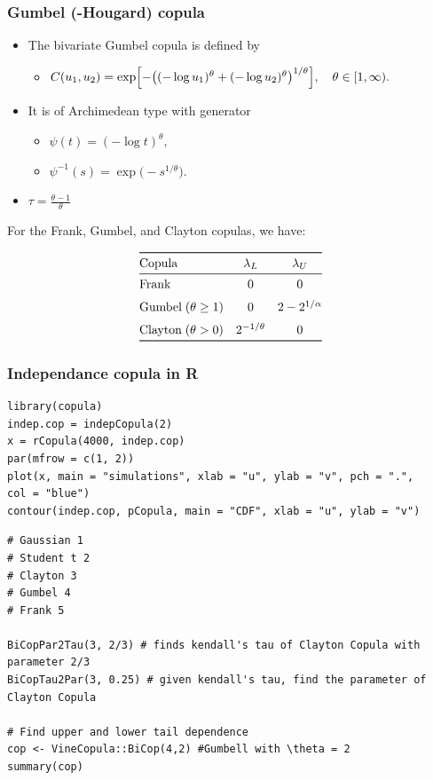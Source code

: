 \documentclass{article}
\begin{document}
\subsubsection{Gumbel (-Hougard) copula}
\begin{itemize}
  \item The bivariate Gumbel copula is defined by
  \begin{itemize}
      \item $C(u_1,u_2)
      = \exp\Bigl[-\bigl((-\log u_1)^\theta + (-\log u_2)^\theta\bigr)^{1/\theta}\Bigr],
      \quad \theta\in[1,\infty).$
  \end{itemize}
  \item It is of Archimedean type with generator
    \begin{itemize}
      \item \(\displaystyle \psi(t) = (-\log t)^\theta,\)
      \item \(\displaystyle \psi^{-1}(s) = \exp\bigl(-s^{1/\theta}\bigr).\)
    \end{itemize}
    \item $\tau = \frac{\theta -1 }{\theta}$
\end{itemize}


For the Frank, Gumbel, and Clayton copulas, we have:

\[
\begin{array}{@{}lcc@{}}
\toprule
\text{Copula} & \lambda_L & \lambda_U \\
\midrule
\text{Frank} 
  & 0 
  & 0 \\[6pt]
\text{Gumbel}\;(\theta \ge 1) 
  & 0 
  & 2 - 2^{1/\alpha} \\[6pt]
\text{Clayton}\;(\theta > 0) 
  & 2^{-1/\theta} 
  & 0 \\
\bottomrule
\end{array}
\]

\subsubsection{Independance copula in R}
\begin{lstlisting}
library(copula)
indep.cop = indepCopula(2)
x = rCopula(4000, indep.cop)
par(mfrow = c(1, 2))
plot(x, main = "simulations", xlab = "u", ylab = "v", pch = ".",
col = "blue")
contour(indep.cop, pCopula, main = "CDF", xlab = "u", ylab = "v")
\end{lstlisting}


\begin{lstlisting}
# Gaussian 1
# Student t 2
# Clayton 3
# Gumbel 4
# Frank 5

BiCopPar2Tau(3, 2/3) # finds kendall's tau of Clayton Copula with parameter 2/3
BiCopTau2Par(3, 0.25) # given kendall's tau, find the parameter of Clayton Copula

# Find upper and lower tail dependence
cop <- VineCopula::BiCop(4,2) #Gumbell with \theta = 2
summary(cop)
\end{lstlisting}
\end{document}
